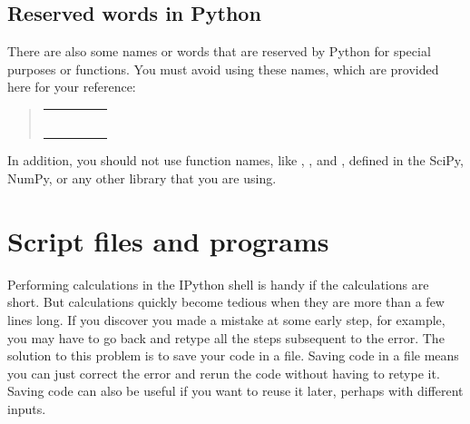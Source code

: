 \documentclass[letterpaper,10pt,english]{sphinxmanual}
\begin{document}
\subsection{Reserved words in Python}
\label{chap2/chap2_basics:index-15}\label{chap2/chap2_basics:reserved-words-in-python}
There are also some names or words that are reserved by Python for special purposes or functions.  You must avoid using these names, which are provided here for your reference:
\begin{quote}

\begin{tabulary}{\linewidth}{|L|L|L|L|L|}
\hline

 & 
 & 
 & 
 & 
\\\hline

 & 
 & 
 & 
 & 
\\\hline

 & 
 & 
 & 
 & 
\\\hline

 & 
 & 
 & 
 & \\\hline

 & 
 & 
 & 
 & \\\hline

 & 
 & 
 & 
 & \\\hline

 & 
 & 
 & 
 & \\\hline
\end{tabulary}

\end{quote}

In addition, you should not use function names, like , , and , defined in the SciPy, NumPy, or any other library that you are using.


\section{Script files and programs}
\label{chap2/chap2_basics:index-16}\label{chap2/chap2_basics:script-files-and-programs}
Performing calculations in the IPython shell is handy if the calculations are short.  But calculations quickly become tedious when they are more than a few lines long.  If you discover you made a mistake at some early step, for example, you may have to go back and retype all the steps subsequent to the error.  The solution to this problem is to save your code in a file.  Saving code in a file means you can just correct the error and rerun the code without having to retype it.  Saving code can also be useful if you want to reuse it later, perhaps with different inputs.
\end{document}
